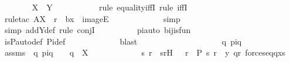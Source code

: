 \begin{isabellebody}
\ \ \ \ \ \ \isamarkupfalse%
\ {\isachardoublequoteopen}{\isasympi}{\isacharbackquote}{\kern0pt}{\isacharbackquote}{\kern0pt}X\ {\isacharequal}{\kern0pt}\ Y{\isachardoublequoteclose}\ \isanewline
\ \ \ \ \ \ \ \ \isamarkupfalse%
\ {\isacharparenleft}{\kern0pt}rule\ equality{\isacharunderscore}{\kern0pt}iffI{\isacharsemicolon}{\kern0pt}\ rule\ iffI{\isacharparenright}{\kern0pt}\isanewline
\ \ \ \ \ \ \ \ \ \isamarkupfalse%
\ {\isacharparenleft}{\kern0pt}rule{\isacharunderscore}{\kern0pt}tac\ A{\isacharequal}{\kern0pt}X\ \ r{\isacharequal}{\kern0pt}{\isasympi}\ \ b{\isacharequal}{\kern0pt}x\ \ imageE{\isacharparenright}{\kern0pt}\ \isanewline
\ \ \ \ \ \ \ \ \ \ \isamarkupfalse%
\ simp\ \isanewline
\ \ \ \ \ \ \ \ \isamarkupfalse%
\ {\isacharparenleft}{\kern0pt}simp\ add{\isacharcolon}{\kern0pt}Y{\isacharunderscore}{\kern0pt}def{\isacharsemicolon}{\kern0pt}\ rule\ conjI{\isacharparenright}{\kern0pt}\isanewline
\ \ \ \ \ \ \ \ \isamarkupfalse%
\ piauto\ bij{\isacharunderscore}{\kern0pt}is{\isacharunderscore}{\kern0pt}fun\ \isanewline
\ \ \ \ \ \ \ \ \isamarkupfalse%
\ is{\isacharunderscore}{\kern0pt}P{\isacharunderscore}{\kern0pt}auto{\isacharunderscore}{\kern0pt}def\ Pi{\isacharunderscore}{\kern0pt}def\ \isanewline
\ \ \ \ \ \ \ \ \ \ \isamarkupfalse%
\ blast\ \isanewline
\ \ \ \ \ \ \isamarkupfalse%
\ {\isacharminus}{\kern0pt}\ \isanewline
\ \ \ \ \ \ \ \ \isamarkupfalse%
\ q\ piq\ \isamarkupfalse%
\ assms\ {\isacharcolon}{\kern0pt}\ {\isachardoublequoteopen}{\isacharless}{\kern0pt}q{\isacharcomma}{\kern0pt}\ piq{\isachargreater}{\kern0pt}\ {\isasymin}\ {\isasympi}{\isachardoublequoteclose}\ \ {\isachardoublequoteopen}q\ {\isasymin}\ X{\isachardoublequoteclose}\ \isanewline
\ \ \ \ \ \ \ \ \isamarkupfalse%
\ \isamarkupfalse%
\ s\ r\ \ srH\ {\isacharcolon}{\kern0pt}\ \ {\isachardoublequoteopen}r\ {\isasymin}\ P{\isachardoublequoteclose}\ {\isachardoublequoteopen}{\isacharless}{\kern0pt}s{\isacharcomma}{\kern0pt}\ r{\isachargreater}{\kern0pt}\ {\isasymin}\ y{\isachardoublequoteclose}\ {\isachardoublequoteopen}q{\isasympreceq}r{\isachardoublequoteclose}\ {\isachardoublequoteopen}forces{\isacharunderscore}{\kern0pt}eq{\isacharparenleft}{\kern0pt}q{\isacharcomma}{\kern0pt}x{\isacharcomma}{\kern0pt}s{\isacharparenright}{\kern0pt}{\isachardoublequoteclose}\ \isamarkupfalse%

\end{isabellebody}
